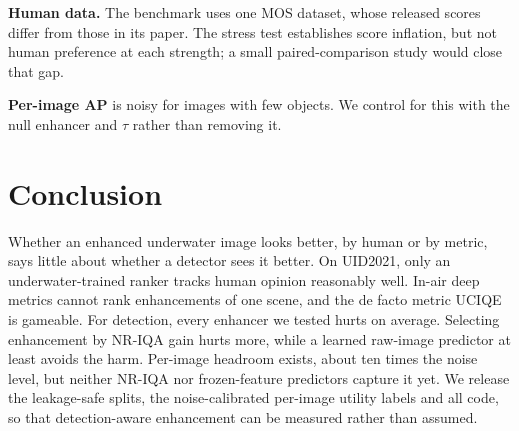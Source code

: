 \documentclass[conference]{IEEEtran}
\begin{document}
\textbf{Human data.} The benchmark uses one MOS dataset, whose released scores differ from those in its paper. The stress test establishes score inflation, but not human preference at each strength; a small paired-comparison study would close that gap.

\textbf{Per-image AP} is noisy for images with few objects. We control for this with the null enhancer and $\tau$ rather than removing it.

\section{Conclusion}
Whether an enhanced underwater image looks better, by human or by metric, says little about whether a detector sees it better. On UID2021, only an underwater-trained ranker tracks human opinion reasonably well. In-air deep metrics cannot rank enhancements of one scene, and the de facto metric UCIQE is gameable. For detection, every enhancer we tested hurts on average. Selecting enhancement by NR-IQA gain hurts more, while a learned raw-image predictor at least avoids the harm. Per-image headroom exists, about ten times the noise level, but neither NR-IQA nor frozen-feature predictors capture it yet. We release the leakage-safe splits, the noise-calibrated per-image utility labels and all code, so that detection-aware enhancement can be measured rather than assumed.



\end{document}

